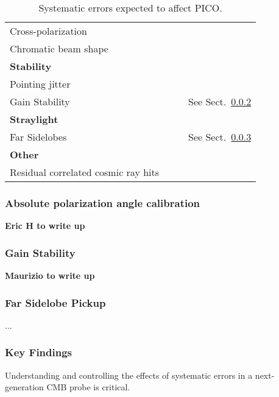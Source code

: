 \documentclass[PICOReport.tex]{subfiles}
\begin{document}
\begin{table}[h!]
\begin{tabular}{p{4.1cm} p{4.1cm} p{4.1cm} p{4.1cm}}
Cross-polarization &
\\
Chromatic beam shape
\\
\hline 
\textbf{Stability} & & \\

Pointing jitter
\\

Gain Stability & & &
See Sect.~\ref{sec:gain}
\\
\hline
\textbf{Straylight} & & \\
Far Sidelobes& & &
See Sect.~\ref{sec:fsl}\\
 \hline
\textbf{Other} \\
Residual correlated cosmic ray hits &
\\
\hline
 \end{tabular}
\caption{\label{tbl:SystematicsList} Systematic errors expected to affect PICO.}
 \end{table}

\subsubsection{Absolute polarization angle calibration}
\label{sec:angle}
\textbf{Eric H to write up}

\subsubsection{Gain Stability}
\label{sec:gain}
\textbf{Maurizio to write up}

\subsubsection{Far Sidelobe Pickup}
\label{sec:fsl}
...

\subsubsection{Key Findings}
Understanding and controlling the effects of systematic errors in a
next-generation CMB probe is critical.
\end{document}
